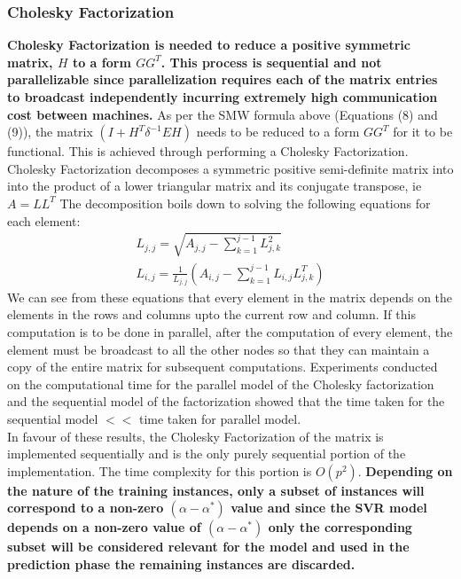 \documentclass[12pt]{article}
\begin{document}
\subsubsection{Cholesky Factorization}
\label{Cholesky Factorization} 
  {\bf Cholesky Factorization is needed to reduce a positive symmetric matrix, $H$ to a form $GG^T$. This process is sequential and not parallelizable since parallelization requires each of the matrix entries to broadcast independently incurring extremely high communication cost between machines.}
 \newline\newline
As per the SMW formula above (Equations (8) and (9)), the matrix $(I + H^T \delta^{-1}EH)$ needs to be reduced to a form $GG^T$ for it to be functional. This is achieved through performing a Cholesky Factorization.\\
Cholesky Factorization decomposes a symmetric positive semi-definite matrix into into the product of a lower triangular matrix and its conjugate transpose, ie $A = LL^T$
\newline
The decomposition boils down to solving the following equations for each element:
\begin{gather*}
L_{j, j} = \sqrt{A_{j, j} -  \sum_{k=1}^{j-1}{L_{j, k}^2}}\\
L_{i, j} = \frac{1}{L_{j, j}}(A_{i, j} -  \sum_{k=1}^{j-1}{L_{i,j}L_{j, k}^T})
\end{gather*}
We can see from these equations that every element in the matrix depends on the elements in the rows and columns upto the current row and column.  If this computation is to be done in parallel, after the computation of every element, the element must be broadcast to all the other nodes so that they can maintain a copy of the entire matrix for subsequent computations. Experiments conducted on the computational time for the parallel model of the Cholesky factorization and the sequential model of the factorization showed that the time taken for the sequential model  $ << $ time taken for parallel model.\\
In favour of these results, the Cholesky Factorization of the matrix is implemented sequentially  and is the only purely sequential portion of the implementation. The time complexity for this portion is $O(p^2)$.
 \newline\newline
 {\bf Depending on the nature of the training instances, only a subset of instances will correspond to a non-zero $(\alpha - \alpha^*)$ value and since the SVR model depends on a non-zero value of $(\alpha - \alpha^*)$ only the corresponding subset will be considered relevant for the model and used in the prediction phase the remaining instances are discarded.}
\end{document}
